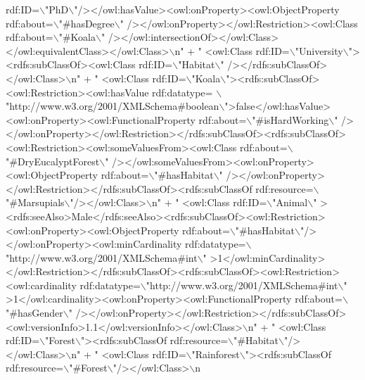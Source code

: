 \begin{DoxyCode}
{       rdf:ID=\(\backslash\)"PhD\(\backslash\)"/></owl:hasValue><owl:onProperty><owl:ObjectProperty rdf:about=\(\backslash\)"#hasDegree\(\backslash\)"
      /></owl:onProperty></owl:Restriction><owl:Class rdf:about=\(\backslash\)"#Koala\(\backslash\)"
      /></owl:intersectionOf></owl:Class></owl:equivalentClass></owl:Class>\(\backslash\)n"}
            + \textcolor{stringliteral}{"  <owl:Class rdf:ID=\(\backslash\)"University\(\backslash\)"><rdfs:subClassOf><owl:Class rdf:ID=\(\backslash\)"Habitat\(\backslash\)"
      /></rdfs:subClassOf></owl:Class>\(\backslash\)n"}
            + \textcolor{stringliteral}{"  <owl:Class rdf:ID=\(\backslash\)"Koala\(\backslash\)"><rdfs:subClassOf><owl:Restriction><owl:hasValue rdf:datatype=
      \(\backslash\)"http://www.w3.org/2001/XMLSchema#boolean\(\backslash\)">false</owl:hasValue><owl:onProperty><owl:FunctionalProperty
       rdf:about=\(\backslash\)"#isHardWorking\(\backslash\)"
      /></owl:onProperty></owl:Restriction></rdfs:subClassOf><rdfs:subClassOf><owl:Restriction><owl:someValuesFrom><owl:Class rdf:about=\(\backslash\)"#DryEucalyptForest\(\backslash\)"
      /></owl:someValuesFrom><owl:onProperty><owl:ObjectProperty rdf:about=\(\backslash\)"#hasHabitat\(\backslash\)"
      /></owl:onProperty></owl:Restriction></rdfs:subClassOf><rdfs:subClassOf rdf:resource=\(\backslash\)"#Marsupials\(\backslash\)"/></owl:Class>\(\backslash\)n"}
            + \textcolor{stringliteral}{"  <owl:Class rdf:ID=\(\backslash\)"Animal\(\backslash\)"
      ><rdfs:seeAlso>Male</rdfs:seeAlso><rdfs:subClassOf><owl:Restriction><owl:onProperty><owl:ObjectProperty rdf:about=\(\backslash\)"#hasHabitat\(\backslash\)"/></owl:onProperty><owl:minCardinality
       rdf:datatype=\(\backslash\)"http://www.w3.org/2001/XMLSchema#int\(\backslash\)"
      >1</owl:minCardinality></owl:Restriction></rdfs:subClassOf><rdfs:subClassOf><owl:Restriction><owl:cardinality rdf:datatype=\(\backslash\)"http://www.w3.org/2001/XMLSchema#int\(\backslash\)"
      >1</owl:cardinality><owl:onProperty><owl:FunctionalProperty rdf:about=\(\backslash\)"#hasGender\(\backslash\)"
      /></owl:onProperty></owl:Restriction></rdfs:subClassOf><owl:versionInfo>1.1</owl:versionInfo></owl:Class>\(\backslash\)n"}
            + \textcolor{stringliteral}{"  <owl:Class rdf:ID=\(\backslash\)"Forest\(\backslash\)"><rdfs:subClassOf rdf:resource=\(\backslash\)"#Habitat\(\backslash\)"/></owl:Class>\(\backslash\)n"}
            + \textcolor{stringliteral}{"  <owl:Class rdf:ID=\(\backslash\)"Rainforest\(\backslash\)"><rdfs:subClassOf rdf:resource=\(\backslash\)"#Forest\(\backslash\)"/></owl:Class>\(\backslash\)n
}
\end{DoxyCode}
